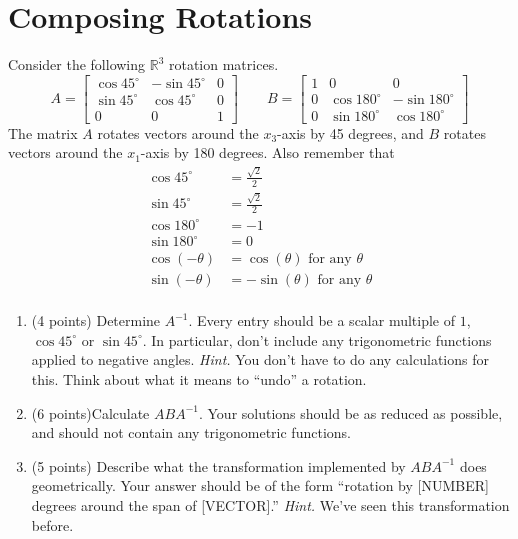 \documentclass{article}
\theoremstyle{remark}
\begin{document}
\section{Composing Rotations}
Consider the following $\mathbb R^3$ rotation matrices.
\begin{displaymath}
  A =
  \begin{bmatrix}
    \cos 45^\circ & -\sin 45^\circ & 0 \\
    \sin 45^\circ & \cos 45^\circ & 0 \\
    0 & 0 & 1
  \end{bmatrix}
  \qquad
  B =
  \begin{bmatrix}
    1 & 0 & 0 \\
    0 & \cos 180^\circ & -\sin 180^\circ \\
    0 & \sin 180^\circ & \cos 180^\circ
  \end{bmatrix}
\end{displaymath}
The matrix $A$ rotates vectors around the $x_3$-axis by 45 degrees, and $B$ rotates vectors around the $x_1$-axis by 180 degrees.
Also remember that
\begin{align*}
  \cos 45^\circ &= \frac{\sqrt{2}}{2} \\
  \sin 45^\circ &= \frac{\sqrt{2}}{2} \\
  \cos 180^\circ &= -1 \\
  \sin 180^\circ &= 0 \\
  \cos(-\theta) &= \cos(\theta) \text{ for any $\theta$} \\
  \sin(-\theta) &= -\sin(\theta) \text{ for any $\theta$} \\
\end{align*}
\begin{enumerate}
\item (4 points) Determine $A^{-1}$.
  Every entry should be a scalar multiple of $1$, $\cos 45^\circ$ or $\sin 45^{\circ}$.
  In particular, don't include any trigonometric functions applied to negative angles.
  \textit{Hint.} You don't have to do any calculations for this.
  Think about what it means to ``undo'' a rotation.
\item (6 points)Calculate $ABA^{-1}$.
  Your solutions should be as reduced as possible, and should not contain any trigonometric functions.
\item (5 points) Describe what the transformation implemented by $ABA^{-1}$ does geometrically. Your answer should be of the form ``rotation by [NUMBER] degrees around the span of [VECTOR].'' \textit{Hint.} We've seen this transformation before.
\end{enumerate}
\end{document}
